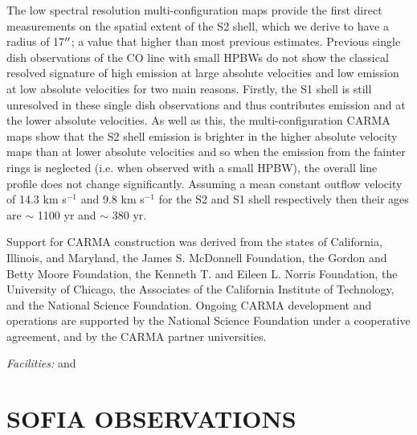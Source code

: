 \documentclass[iop]{emulateapj}
\begin{document}
The low spectral resolution multi-configuration maps provide the first direct measurements on the spatial extent of the S2 shell, which we derive to have a radius of 17$\mbox{$^{\prime\prime}$}$; a value that higher than most previous estimates. Previous single dish observations of the CO line with small HPBWs do not show the classical resolved  signature of high emission at large absolute velocities and low emission at low absolute velocities for two main reasons. Firstly, the S1 shell is still unresolved in these single dish observations and thus contributes emission and at the lower absolute velocities. As well as this, the multi-configuration CARMA maps show that the S2 shell emission is brighter in the higher absolute velocity maps than at lower absolute velocities and so when the emission from the fainter rings is neglected (i.e. when observed with a small HPBW), the overall line profile does not change significantly. Assuming a mean constant outflow velocity of 14.3 km s${}^{-1}$ and 9.8 km s${}^{-1}$ for the S2 and S1 shell respectively then their ages are $\sim$ 1100 yr and $\sim$ 380 yr. 

\acknowledgments

Support for CARMA construction was derived from the states of California, Illinois, and
Maryland, the James S. McDonnell Foundation, the Gordon and Betty Moore Foundation, the
Kenneth T. and Eileen L. Norris Foundation, the University of Chicago, the Associates of the
California Institute of Technology, and the National Science Foundation. Ongoing CARMA
development and operations are supported by the National Science Foundation under a
cooperative agreement, and by the CARMA partner universities.


{\it Facilities:}  and  %



\appendix
\section{SOFIA OBSERVATIONS}
\end{document}
